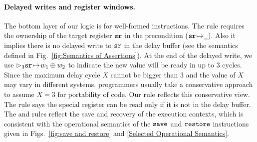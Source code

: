 \paragraph{\textbf{Delayed writes and register windows.}}
The bottom layer of our logic is for well-formed instructions.
The  rule requires the ownership
of the target
register $\texttt{sr}$ in the precondition (${\texttt{sr}} \!\mapsto\! {\underline{\ \,}}$).
Also it implies there is no delayed write to $\texttt{sr}$
in the delay buffer (see the semantics defined in
Fig.~\ref{fig:Semantics of Assertions}).
At the end of the delayed write, we use
$\rhd_{3}{\texttt{sr}} \!\mapsto\! {w_1 \oplus w_2}$ to indicate
the new value will be ready in up to 3 cycles.
Since the maximum delay cycle $X$ cannot be bigger
than 3 and the value of $X$ may vary in different systems,
programmers usually take a conservative approach to
assume $X=3$ for portability of code. Our rule
reflects this conservative view.
The  rule says the special
register can be read only if it is not in the
delay buffer.
The  and  rules
reflect the save and recovery of the execution
contexts, which is consistent with the operational
semantics of the $\texttt{save}$ and $\texttt{restore}$ instructions
given in Figs.~\ref{fig:save and restore}
and \ref{Selected Operational Semantics}.



